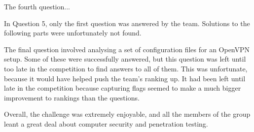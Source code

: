 The fourth question... 

In Question 5, only the first question was answered by the team. Solutions to
the following parts were unfortunately not found.

The final question involved analysing a set of configuration files for an 
OpenVPN setup. Some of these were successfully answered, but this question was
left until too late in the competition to find answers to all of them. This
was unfortunate, because it would have helped push the team's ranking up. It
had been left until late in the competition because capturing flags seemed to
make a much bigger improvement to rankings than the questions.

Overall, the challenge was extremely enjoyable, and all the members of the
group leant a great deal about computer security and penetration testing.
